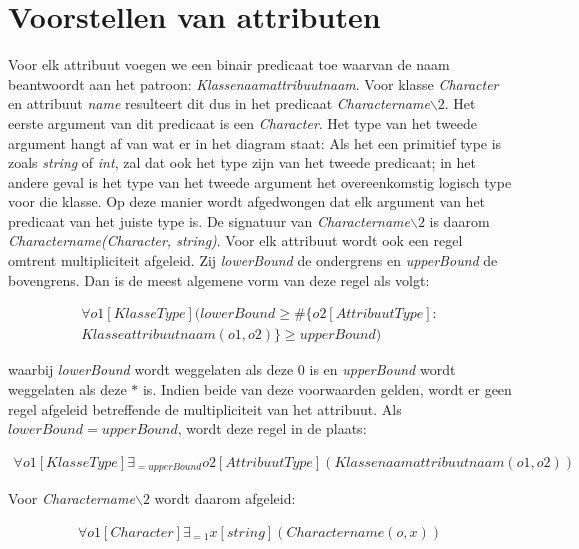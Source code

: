 \section{Voorstellen van attributen}
Voor elk attribuut voegen we een binair predicaat toe waarvan de naam beantwoordt aan het patroon: \textit{Klassenaamattribuutnaam}. Voor klasse \textit{Character} en attribuut \textit{name} resulteert dit dus in het predicaat \textit{Charactername$\backslash2$}. Het eerste argument van dit predicaat is een \textit{Character}. Het type van het tweede argument hangt af van wat er in het diagram staat: Als het een primitief type is zoals \textit{string} of \textit{int}, zal dat ook het type zijn van het tweede predicaat; in het andere geval is het type van het tweede argument het overeenkomstig logisch type voor die klasse. Op deze manier wordt afgedwongen dat elk argument van het predicaat van het juiste type is.
De signatuur van \textit{Charactername$\backslash2$} is daarom \textit{Charactername(Character, string)}.
Voor elk attribuut wordt ook een regel omtrent multipliciteit afgeleid. Zij \textit{lowerBound} de ondergrens en \textit{upperBound} de bovengrens. Dan is de meest algemene vorm van deze regel als volgt:
	
\begin{align*}
	\forall{o1}[KlasseType](lowerBound \geq \#\{o2 [AttribuutType] : \\ Klasseattribuutnaam(o1,o2)\} \geq upperBound)
\end{align*}
	
waarbij \textit{lowerBound} wordt weggelaten als deze $0$ is en \textit{upperBound} wordt weggelaten als deze $*$ is. Indien beide van deze voorwaarden gelden, wordt er geen regel afgeleid betreffende de multipliciteit van het attribuut. Als $lowerBound = upperBound$, wordt deze regel in de plaats:
	
\begin{align*}
	\forall{o1}[KlasseType] \exists_{=upperBound}{o2}[AttribuutType](Klassenaamattribuutnaam(o1,o2))
\end{align*}
	
Voor \textit{Charactername$\backslash2$} wordt daarom afgeleid:
	
\begin{align*}
	\forall{o1}[Character]\exists_{=1}{x}[string](Charactername(o,x))
\end{align*}

